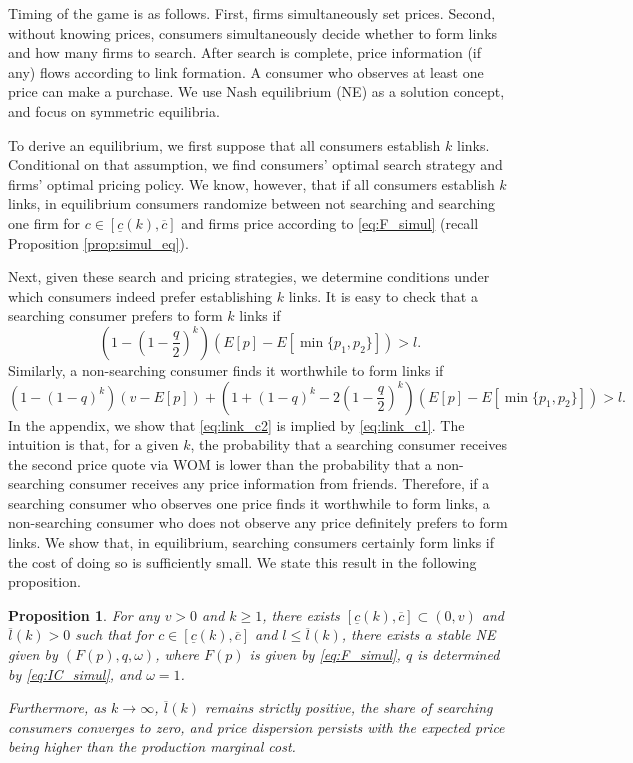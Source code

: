 \documentclass[12pt]{article}
\newtheorem{proposition}{Proposition}
\begin{document}
Timing of the game is as follows.  First, firms simultaneously 
set prices. Second, without knowing prices, consumers 
simultaneously decide whether to form links and how many firms 
to search.  After search is complete, price information (if any) 
flows according to link formation. A consumer who observes at 
least one price can make a purchase.  We  use Nash equilibrium 
(NE) as a solution concept, and focus on symmetric equilibria. 

To derive an equilibrium, we first suppose that all consumers 
establish $k$ links.  Conditional on that assumption, we find 
consumers' optimal search strategy and firms' optimal pricing 
policy.  We know, however, that if all consumers establish $k$ 
links, in equilibrium consumers randomize between not searching 
and searching one firm for $c \in [\underline{c}(k), 
\overline{c}]$ and firms price according to \eqref{eq:F_simul} 
(recall Proposition \ref{prop:simul_eq}).  

Next, given these search and pricing strategies, we determine 
conditions under which consumers indeed prefer establishing $k$ 
links.  It is easy to check that 
a searching consumer prefers to form $k$ links if
\begin{equation}\label{eq:link_c1}
\left(1 - \left(1 - \frac{q}{2}\right)^k\right)(E[p]-E[\min\{p_1,p_2\}]) >l.
\end{equation}
Similarly, a non-searching consumer finds it worthwhile to form links if
\begin{equation}\label{eq:link_c2}
\left(1 - \left(1-q\right)^k\right)(v-E[p]) + \left(1 + (1-q)^k - 2 \left(1 
- \frac{q}{2}\right)^k\right)(E[p]-E[\min\{p_1,p_2\}]) >l.
\end{equation}
In the appendix, we show that \eqref{eq:link_c2} is implied by 
\eqref{eq:link_c1}.  The intuition is that, for a given $k$, the 
probability that a searching consumer receives the second price 
quote via WOM is lower than the probability that a non-searching 
consumer receives any price information from friends.  
Therefore, if a searching consumer who observes one price finds 
it worthwhile to form links, a non-searching consumer who does 
not observe any price definitely prefers to form links.  We show 
that, in equilibrium, searching consumers certainly form links 
if the cost of doing so is sufficiently small.  We state this 
result in the following proposition.


\begin{proposition}\label{prop:simul_endo}
	For any $v>0$ and $k\geq 1$, there exists $[\underline{c}(k), 
	\overline{c}] \subset(0,v)$ and $\overline{l}(k)>0$ such that for $c\in 
	[\underline{c}(k), \overline{c}]$ and $l\leq \overline{l}(k)$, there exists 
	a stable NE given by $\left(F(p), q,\omega \right)$, where 
	$F(p)$ is given 
	by \eqref{eq:F_simul}, $q$ is determined by \eqref{eq:IC_simul}, and 
	$\omega =1$.
	
	Furthermore, as $k \to \infty$, $\overline{l}(k)$ remains 
	strictly positive, the share of searching consumers 
	converges to zero, and price dispersion persists with the 
	expected price being higher than the production marginal 
	cost.
\end{proposition}
\end{document}
